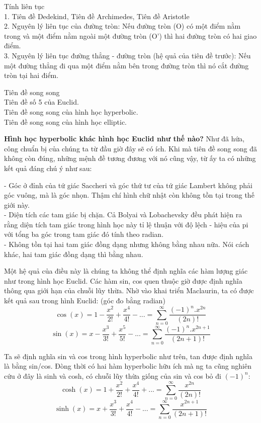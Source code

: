 \begin{multicols}{2}
	Tính liên tục \\
	1. Tiên đề Dedekind, Tiên đề Archimedes, Tiên đề Aristotle \\
	2. Nguyên lý liên tục của đường tròn: Nếu đường tròn (O) có một điểm nằm trong và một điểm nằm ngoài một đường tròn (O') thì hai đường tròn có hai giao điểm. \\
	3. Nguyên lý liên tục đường thẳng - đường tròn (hệ quả của tiên đề trước): Nếu một đường thẳng đi qua một điểm nằm bên trong đường tròn thì nó cắt đường tròn tại hai điểm.
	
	Tiên đề song song \\
	Tiên đề số 5 của Euclid.\\
	Tiên đề song song của hình học hyperbolic. \\ 
	Tiên đề song song của hình học elliptic.
	
	\textbf{\color{lichsutoanhoc}Hình học hyperbolic khác hình học Euclid như thế nào?}
	Như đã hứa, công chuẩn bị của chúng ta từ đầu giờ đây sẽ có ích. Khi mà tiên đề song song đã không còn đúng, những mệnh đề tương đương với nó cũng vậy, từ ấy ta có những kết quả đáng chú ý như sau:
	
	- Góc ở đỉnh của tứ giác Saccheri và góc thứ tư của tứ giác Lambert không phải góc vuông, mà là góc nhọn. Thậm chí hình chữ nhật còn không tồn tại trong thế giới này.  \\
	- Diện tích các tam giác bị chặn. Cả Bolyai và Lobachevsky đều phát hiện ra rằng diện tích tam giác trong hình học này tỉ lệ thuận với độ lệch - hiệu của pi với tổng ba góc trong tam giác đó tính theo radian. \\
	- Không tồn tại hai tam giác đồng dạng nhưng không bằng nhau nữa. Nói cách khác, hai tam giác đồng dạng thì bằng nhau. 
	
	Một hệ quả của điều này là chúng ta không thể định nghĩa các hàm lượng giác như trong hình học Euclid. Các hàm sin, cos quen thuộc giờ được định nghĩa thông qua giới hạn của chuỗi lũy thừa. Nhờ vào khai triển Maclaurin, ta có được kết quả sau trong hình Euclid: (góc đo bằng radian)
	\[ \cos(x) =  1 - \frac{x^2}{2!} + \frac{x^4}{4!} - ... = \sum_{n=0}^{\infty} \frac{(-1)^n.x^{2n}}{(2n)!} \]
	\[  \sin(x) =  x - \frac{x^3}{3!} + \frac{x^5}{5!} - ... = \sum_{n=0}^{\infty} \frac{(-1)^n.x^{2n+1}}{(2n+1)!} \]
	
	Ta sẽ định nghĩa sin và cos trong hình hyperbolic như trên, tan được định nghĩa là bằng sin/cos.
	Đòng thời có hai hàm hyperbolic hữu ích mà ng ta cũng nghiên cứu ở đây là sinh và cosh, có chuỗi lũy thừa giống của sin và cos bỏ đi $(-1)^n$:
	\[ \cosh(x) =  1 + \frac{x^2}{2!} + \frac{x^4}{4!} + ... = \sum_{n=0}^{\infty} \frac{x^{2n}}{(2n)!} \]
	\[  \sinh(x) =  x + \frac{x^3}{3!} + \frac{x^4}{4!} - ... = \sum_{n=0}^{\infty} \frac{x^{2n+1}}{(2n+1)!} \]
	

\end{multicols}
